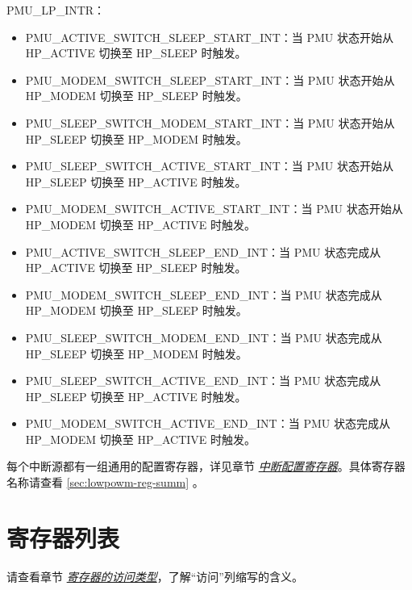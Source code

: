 \documentclass[main\_\_CN.tex]{subfiles}
\begin{document}
PMU\_LP\_INTR：

\begin{itemize}
\item \label{int:PMUACTIVESWITCHSLEEPSTARTINT}PMU\_ACTIVE\_SWITCH\_SLEEP\_START\_INT：当 PMU 状态开始从 HP\_ACTIVE 切换至 HP\_SLEEP 时触发。
\item \label{int:PMUMODEMSWITCHSLEEPSTARTINT}PMU\_MODEM\_SWITCH\_SLEEP\_START\_INT：当 PMU 状态开始从 HP\_MODEM 切换至 HP\_SLEEP 时触发。
\item \label{int:PMUSLEEPSWITCHMODEMSTARTINT}PMU\_SLEEP\_SWITCH\_MODEM\_START\_INT：当 PMU 状态开始从 HP\_SLEEP 切换至 HP\_MODEM 时触发。
\item \label{int:PMUSLEEPSWITCHACTIVESTARTINT}PMU\_SLEEP\_SWITCH\_ACTIVE\_START\_INT：当 PMU 状态开始从 HP\_SLEEP 切换至 HP\_ACTIVE 时触发。
\item \label{int:PMUMODEMSWITCHACTIVESTARTINT}PMU\_MODEM\_SWITCH\_ACTIVE\_START\_INT：当 PMU 状态开始从 HP\_MODEM 切换至 HP\_ACTIVE 时触发。
\item \label{int:PMUACTIVESWITCHSLEEPENDINT}PMU\_ACTIVE\_SWITCH\_SLEEP\_END\_INT：当 PMU 状态完成从 HP\_ACTIVE 切换至 HP\_SLEEP 时触发。
\item \label{int:PMUMODEMSWITCHSLEEPENDINT}PMU\_MODEM\_SWITCH\_SLEEP\_END\_INT：当 PMU 状态完成从 HP\_MODEM 切换至 HP\_SLEEP 时触发。
\item \label{int:PMUSLEEPSWITCHMODEMENDINT}PMU\_SLEEP\_SWITCH\_MODEM\_END\_INT：当 PMU 状态完成从 HP\_SLEEP 切换至 HP\_MODEM 时触发。
\item \label{int:PMUSLEEPSWITCHACTIVEENDINT}PMU\_SLEEP\_SWITCH\_ACTIVE\_END\_INT：当 PMU 状态完成从 HP\_SLEEP 切换至 HP\_ACTIVE 时触发。
\item \label{int:PMUMODEMSWITCHACTIVEENDINT}PMU\_MODEM\_SWITCH\_ACTIVE\_END\_INT：当 PMU 状态完成从 HP\_MODEM 切换至 HP\_ACTIVE 时触发。
\end{itemize}

每个中断源都有一组通用的配置寄存器，详见章节 \hyperref[interrupt-config-registers]{\textit{中断配置寄存器}}。具体寄存器名称请查看 \ref{sec:lowpowm-reg-summ} \textit{}。

\newpage
\section{寄存器列表}\hypertarget{lowpowm-reg-summ}{}\label{sec:lowpowm-reg-summ}

请查看章节 \hyperref[glossary-access-types]{\textit{寄存器的访问类型}}，了解“访问”列缩写的含义。
\end{document}
